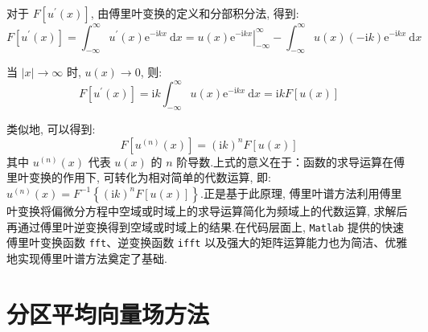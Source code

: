 对于 $F\left[u^{\prime}(x)\right]$, 由傅里叶变换的定义和分部积分法, 得到:
\begin{equation}
    F\left[u^{\prime}(x)\right] = \int_{-\infty}^{\infty} u^{\prime}(x) \mathrm{e}^{-\mathrm{i} k x} \mathrm{~d} x = \left.u(x) \mathrm{e}^{-\mathrm{i} k x}\right|_{-\infty}^{\infty} - \int_{-\infty}^{\infty} u(x)(-\mathrm{i} k) \mathrm{e}^{-\mathrm{i} k x} \mathrm{~d} x \label{eq:3-7}
\end{equation}

当 $\mid x\mid  \rightarrow \infty$ 时, $u(x) \rightarrow 0$, 则:
\begin{equation}
    F\left[u^{\prime}(x)\right] = \mathrm{i} k \int_{-\infty}^{\infty} u(x) \mathrm{e}^{-\mathrm{i} k x} \mathrm{~d} x = \mathrm{i} k F[u(x)] \label{eq:3-8}
\end{equation}

类似地, 可以得到:
\begin{equation}
    F\left[u^{(n)}(x)\right] = (\mathrm{i} k)^n F[u(x)] \label{eq:3-9}
\end{equation}
其中 $u^{(n)}(x)$ 代表 $u(x)$ 的 $n$ 阶导数.上式的意义在于：函数的求导运算在傅里叶变换的作用下, 可转化为相对简单的代数运算, 即: $u^{(n)}(x) = F^{-1}\left\{(\mathrm{i} k)^n F[u(x)]\right\}$.正是基于此原理, 傅里叶谱方法利用傅里叶变换将偏微分方程中空域或时域上的求导运算简化为频域上的代数运算, 求解后再通过傅里叶逆变换得到空域或时域上的结果.在代码层面上, \texttt{Matlab} 提供的快速傅里叶变换函数 \texttt{fft}、逆变换函数 \texttt{ifft} 以及强大的矩阵运算能力也为简洁、优雅地实现傅里叶谱方法奠定了基础.


\section{分区平均向量场方法}


